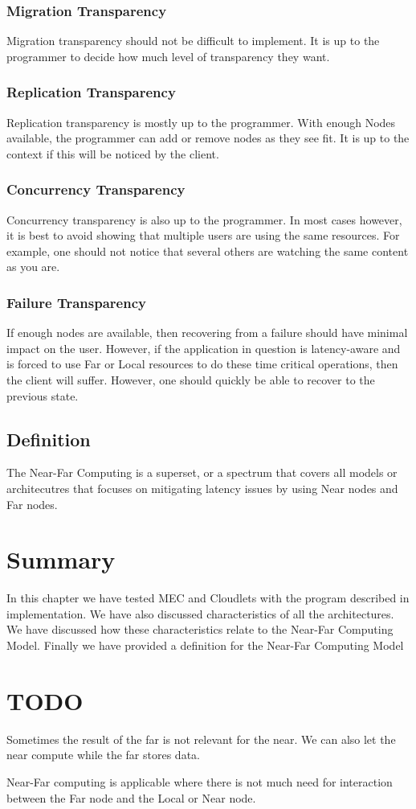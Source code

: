 \subsubsection{Migration Transparency}
Migration transparency should not be difficult to implement. It is up to the programmer to decide how much level of transparency they want. 

\subsubsection{Replication Transparency}
Replication transparency is mostly up to the programmer. With enough Nodes available, the programmer can add or remove nodes as they see fit. It is up to the context if this will be noticed by the client. 

\subsubsection{Concurrency Transparency}
Concurrency transparency is also up to the programmer. In most cases however, it is best to avoid showing that multiple users are using the same resources. For example, one should not notice that several others are watching the same content as you are. 

\subsubsection{Failure Transparency}
If enough nodes are available, then recovering from a failure should have minimal impact on the user. However, if the application in question is latency-aware and is forced to use Far or Local resources to do these time critical operations, then the client will suffer. However, one should quickly be able to recover to the previous state.

\subsection{Definition}
The Near-Far Computing is a superset, or a spectrum that covers all models or architecutres that focuses on mitigating latency issues by using Near nodes and Far nodes. 



\section{Summary}
In this chapter we have tested MEC and Cloudlets with the program described in implementation. We have also discussed characteristics of all the architectures. We have discussed how these characteristics relate to the Near-Far Computing Model. Finally we have provided a definition for the Near-Far Computing Model



\section{TODO}

Sometimes the result of the far is not relevant for the near. We can also let the near compute while the far stores data.

Near-Far computing is applicable where there is not much need for interaction between the Far node and the Local or Near node.

